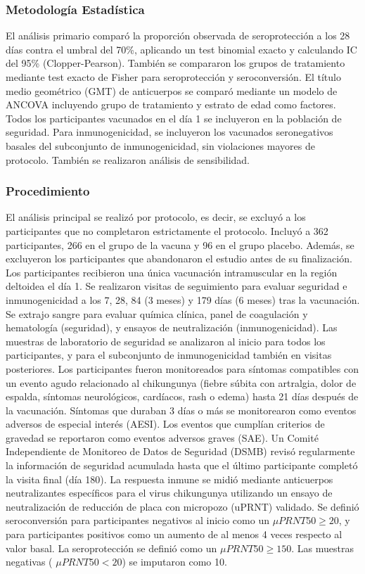 \documentclass[
]{article}
\begin{document}
\subsubsection{Metodología
Estadística}\label{metodologuxeda-estaduxedstica}

El análisis primario comparó la proporción observada de seroprotección a
los 28 días contra el umbral del 70\%, aplicando un test binomial exacto
y calculando IC del 95\% (Clopper-Pearson). También se compararon los
grupos de tratamiento mediante test exacto de Fisher para seroprotección
y seroconversión. El título medio geométrico (GMT) de anticuerpos se
comparó mediante un modelo de ANCOVA incluyendo grupo de tratamiento y
estrato de edad como factores. Todos los participantes vacunados en el
día 1 se incluyeron en la población de seguridad. Para inmunogenicidad,
se incluyeron los vacunados seronegativos basales del subconjunto de
inmunogenicidad, sin violaciones mayores de protocolo. También se
realizaron análisis de sensibilidad.

\subsubsection{Procedimiento}\label{procedimiento}

El análisis principal se realizó por protocolo, es decir, se excluyó a
los participantes que no completaron estrictamente el protocolo. Incluyó
a 362 participantes, 266 en el grupo de la vacuna y 96 en el grupo
placebo. Además, se excluyeron los participantes que abandonaron el
estudio antes de su finalización. Los participantes recibieron una única
vacunación intramuscular en la región deltoidea el día 1. Se realizaron
visitas de seguimiento para evaluar seguridad e inmunogenicidad a los 7,
28, 84 (3 meses) y 179 días (6 meses) tras la vacunación. Se extrajo
sangre para evaluar química clínica, panel de coagulación y hematología
(seguridad), y ensayos de neutralización (inmunogenicidad). Las muestras
de laboratorio de seguridad se analizaron al inicio para todos los
participantes, y para el subconjunto de inmunogenicidad también en
visitas posteriores. Los participantes fueron monitoreados para síntomas
compatibles con un evento agudo relacionado al chikungunya (fiebre
súbita con artralgia, dolor de espalda, síntomas neurológicos,
cardíacos, rash o edema) hasta 21 días después de la vacunación.
Síntomas que duraban 3 días o más se monitorearon como eventos adversos
de especial interés (AESI). Los eventos que cumplían criterios de
gravedad se reportaron como eventos adversos graves (SAE). Un Comité
Independiente de Monitoreo de Datos de Seguridad (DSMB) revisó
regularmente la información de seguridad acumulada hasta que el último
participante completó la visita final (día 180). La respuesta inmune se
midió mediante anticuerpos neutralizantes específicos para el virus
chikungunya utilizando un ensayo de neutralización de reducción de placa
con micropozo (uPRNT) validado. Se definió seroconversión para
participantes negativos al inicio como un \(\mu PRNT50 \geq 20\), y para
participantes positivos como un aumento de al menos 4 veces respecto al
valor basal. La seroprotección se definió como un
\(\mu PRNT50 \geq 150\). Las muestras negativas ( \(\mu PRNT50 < 20\))
se imputaron como 10.
\end{document}
